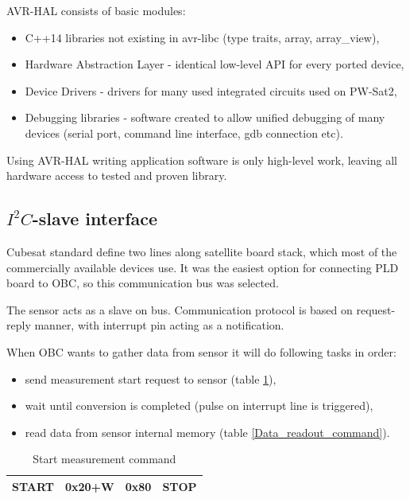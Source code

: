     AVR-HAL consists of basic modules:
    \begin{itemize}
        \item C++14 libraries not existing in avr-libc (type traits, array, array\_view),
        \item Hardware Abstraction Layer - identical low-level API for every ported device,
        \item Device Drivers - drivers for many used integrated circuits used on PW-Sat2,
        \item Debugging libraries - software created to allow unified debugging of many devices (serial port, command line interface, gdb connection etc).
    \end{itemize}

    Using AVR-HAL writing application software is only high-level work, leaving all hardware access to tested and proven library.

    \subsection{$I^2C$-slave interface}
    Cubesat standard define two \iic lines along satellite board stack, which most of the commercially available devices use. It was the easiest option for connecting PLD board to OBC, so this communication bus was selected.

    The sensor acts as a slave on \iic bus. Communication protocol is based on request-reply manner, with interrupt pin acting as a notification.

    When OBC wants to gather data from sensor it will do following tasks in order:
    \begin{itemize}
        \item send measurement start request to sensor (table \ref{Start_measurement_command}),
        \item wait until conversion is completed (pulse on interrupt line is triggered),
        \item read data from sensor internal memory (table \ref{Data_readout_command}).
    \end{itemize}

    \begin{table}[H]
        \begin{center}
            \begin{tabular}{|c|c|c|c|}
                \hline
                START & 0x20+W & 0x80 & STOP \\ \hline
            \end{tabular}
        \end{center}
        \caption{Start measurement command}
        \label{Start_measurement_command}
    \end{table}

